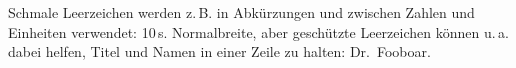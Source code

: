Schmale Leerzeichen werden z.\,B. in
Abkürzungen und zwischen Zahlen und
Einheiten verwendet: 10\,s.
Normalbreite, aber geschützte
Leerzeichen können u.\,a.
dabei helfen, Titel und Namen in
einer Zeile zu halten: Dr.~Fooboar.

